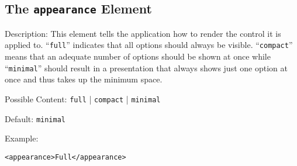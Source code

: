 \subsection{ The \texttt{appearance} Element}
\label{appearance}
\begin{description}
 \item Description: This element tells the application how to render the control it is applied to. ``\texttt{full}'' indicates that all options should always be visible. ``\texttt{compact}'' means that an adequate number of options should be shown at once while ``\texttt{minimal}'' should result in a presentation that always shows just one option at once and thus takes up the minimum space.

 \item Possible Content: \texttt{full} | \texttt{compact} | \texttt{minimal}

 \item Default: \texttt{minimal}

 \item Example: 

\begin{lstlisting}[caption=\texttt{appearance} Attribute]
<appearance>Full</appearance>
\end{lstlisting}
\end{description}
